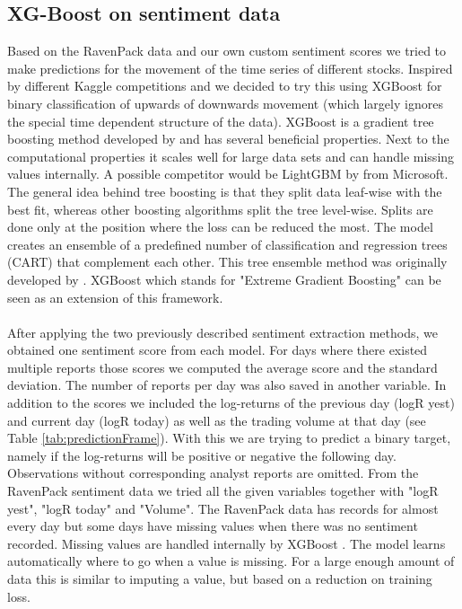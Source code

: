\subsection{XG-Boost on sentiment data}\label{sec:XGB}
Based on the RavenPack data and our own custom sentiment scores we tried to make predictions for the movement of the time series of different stocks. Inspired by different Kaggle competitions and \citep{li2018predicting} we decided to try this using XGBoost for binary classification of upwards of downwards movement (which largely ignores the special time dependent structure of the data). XGBoost is a gradient tree boosting method developed by \citet{Chen_2016} and has several beneficial properties. Next to the computational properties it scales well for large data sets and can handle missing values internally. A possible competitor would be LightGBM by \citet{Ke2017LightGBMAH} from Microsoft. The general idea behind tree boosting is that they split data leaf-wise with the best fit, whereas other boosting algorithms split the tree level-wise. Splits are done only at the position where the loss can be reduced the most. The model creates an ensemble of a predefined number of classification and regression trees (CART) that complement each other. This tree ensemble method was originally developed by \citet{friedman2001greedy}. XGBoost which stands for "Extreme Gradient Boosting" can be seen as an extension of this framework. \\ \\
After applying the two previously described sentiment extraction methods, we obtained one sentiment score from each model. For days where there existed multiple reports those scores we computed the average score and the standard deviation. The number of reports per day was also saved in another variable. In addition to the scores we included the log-returns of the previous day (logR yest) and current day (logR today) as well as the trading volume at that day (see Table \ref{tab:predictionFrame}). With this we are trying to predict a binary target, namely if the log-returns will be positive or negative the following day. Observations without corresponding analyst reports are omitted. 
From the RavenPack sentiment data we tried all the given variables together with "logR yest", "logR today" and "Volume". The RavenPack data has records for almost every day but some days have missing values when there was no sentiment recorded. Missing values are handled internally by XGBoost \citep{Chen_2016}. The model learns automatically where to go when a value is missing. For a large enough amount of data this is similar to imputing a value, but based on a reduction on training loss. 

